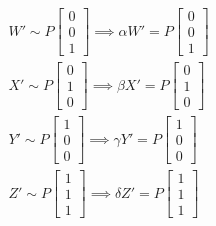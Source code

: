 \documentclass[12pt, oneside]{article}
\begin{document}
\begin{align*}
W' \sim P
 \begin{bmatrix}
0 		\\
0 		\\
1		
\end{bmatrix} \implies 
\alpha W' = P
 \begin{bmatrix}
0 		\\
0 		\\
1		
\end{bmatrix}   \\
X' \sim P
 \begin{bmatrix}
0 		\\
1 		\\
0		
\end{bmatrix} \implies 
\beta X' = P
 \begin{bmatrix}
0 		\\
1 		\\
0		
\end{bmatrix}  \\
Y' \sim P
 \begin{bmatrix}
1 		\\
0 		\\
0		
\end{bmatrix} \implies 
\gamma Y' = P
 \begin{bmatrix}
1 		\\
0 		\\
0		
\end{bmatrix}   \\
Z' \sim P
 \begin{bmatrix}
1 		\\
1 		\\
1		
\end{bmatrix} \implies 
\delta Z' = P
 \begin{bmatrix}
1 		\\
1 		\\
1		
\end{bmatrix} 
\end{align*}
\end{document}
